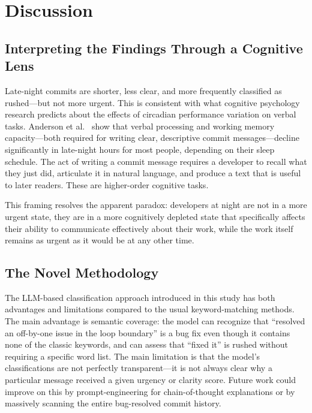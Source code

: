 \documentclass[sigconf]{acmart}
\begin{document}

\section{Discussion}
\label{sec:discussion}

\subsection{Interpreting the Findings Through a Cognitive Lens}

Late-night commits are shorter, less clear, and more frequently classified as rushed---but not more urgent. This is consistent with what cognitive psychology research predicts about the effects of circadian performance variation on verbal tasks. Anderson et al.~\cite{anderson2014} show that verbal processing and working memory capacity---both required for writing clear, descriptive commit messages---decline significantly in late-night hours for most people, depending on their sleep schedule. The act of writing a commit message requires a developer to recall what they just did, articulate it in natural language, and produce a text that is useful to later readers. These are higher-order cognitive tasks.

This framing resolves the apparent paradox: developers at night are not in a more urgent state, they are in a more cognitively depleted state that specifically affects their ability to communicate effectively about their work, while the work itself remains as urgent as it would be at any other time.

\subsection{The Novel Methodology}

The LLM-based classification approach introduced in this study has both advantages and limitations compared to the usual keyword-matching methods. The main advantage is semantic coverage: the model can recognize that ``resolved an off-by-one issue in the loop boundary'' is a bug fix even though it contains none of the classic keywords, and can assess that ``fixed it'' is rushed without requiring a specific word list. The main limitation is that the model's classifications are not perfectly transparent---it is not always clear why a particular message received a given urgency or clarity score. Future work could improve on this by prompt-engineering for chain-of-thought explanations or by massively scanning the entire bug-resolved commit history.
\end{document}
